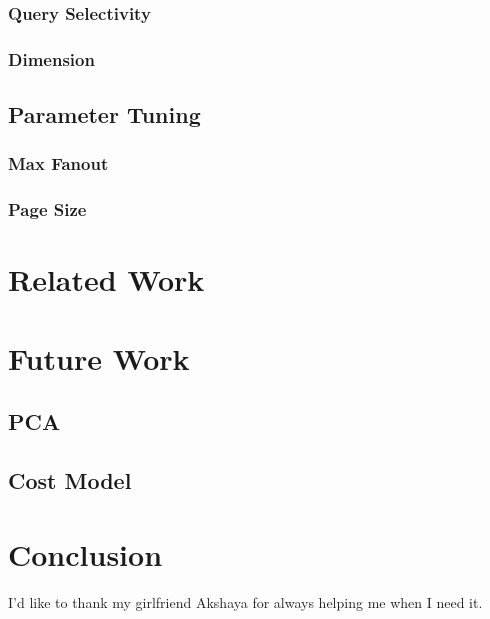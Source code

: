 \documentclass[sigconf,10pt]{acmart}
\begin{document}
\subsubsection{Query Selectivity}

\subsubsection{Dimension}

\subsection{Parameter Tuning}

\subsubsection{Max Fanout}

\subsubsection{Page Size}

\section{Related Work}

\section{Future Work}

\subsection{PCA}

\subsection{Cost Model}

\section{Conclusion}

\begin{acks}
I'd like to thank my girlfriend Akshaya for always helping me when I need it.
\end{acks}



\end{document}
